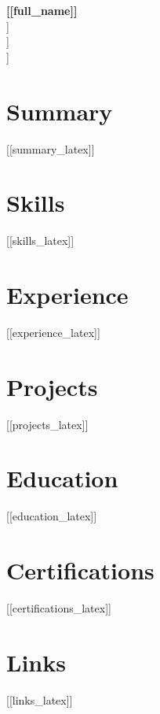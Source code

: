 \documentclass[11pt]{article}
\begin{document}
{\LARGE \textbf{[[full_name]]}}\\
[[headline]]\\
[[contact_line]]\\
[[links_inline]]

\section*{Summary}
[[summary_latex]]

\section*{Skills}
[[skills_latex]]

\section*{Experience}
[[experience_latex]]

\section*{Projects}
[[projects_latex]]

\section*{Education}
[[education_latex]]

\section*{Certifications}
[[certifications_latex]]

\section*{Links}
[[links_latex]]
\end{document}
